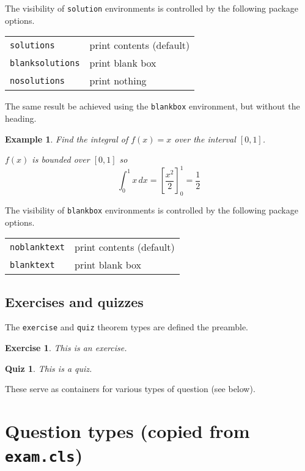 \documentclass{article}
\theoremstyle{break}
\newcounter{theorem}
\newtheorem{example}[theorem]{Example}
\newtheorem{exercise}[theorem]{Exercise}
\newtheorem{quiz}[theorem]{Quiz}
\begin{document}
The visibility of {\tt solution} environments is controlled by the following package options.

\bigskip
\begin{tabular}{ll}
\hline
{\tt solutions}			& print contents (default) \\
{\tt blanksolutions}	& print blank box \\
{\tt nosolutions}		& print nothing \\
\hline
\end{tabular}
\bigskip

The same result be achieved using the {\tt blankbox} environment, but without the heading.
\begin{example}
Find the integral of $f(x)=x$ over the interval $[0,1]$.
\begin{blankbox}
$f(x)$ is bounded over $[0,1]$ so 
\[
\int_0^1 x\,dx = \left[\frac{x^2}{2}\right]_0^1 = \frac{1}{2}
\]
\end{blankbox}
\end{example}

The visibility of {\tt blankbox} environments is controlled by the following package options.

\bigskip
\begin{tabular}{ll}
\hline
{\tt noblanktext}		& print contents (default) \\
{\tt blanktext}			& print blank box \\
\hline
\end{tabular}
\bigskip

\subsection{Exercises and quizzes}
The {\tt exercise} and {\tt quiz} theorem types are defined the preamble.

\begin{exercise}\label{exe:test}
This is an exercise. 
\end{exercise}

\begin{quiz}\label{quiz:test}
This is a quiz. 
\end{quiz}

These serve as containers for various types of question (see below).

\section{Question types (copied from \texttt{exam.cls})}
\end{document}
